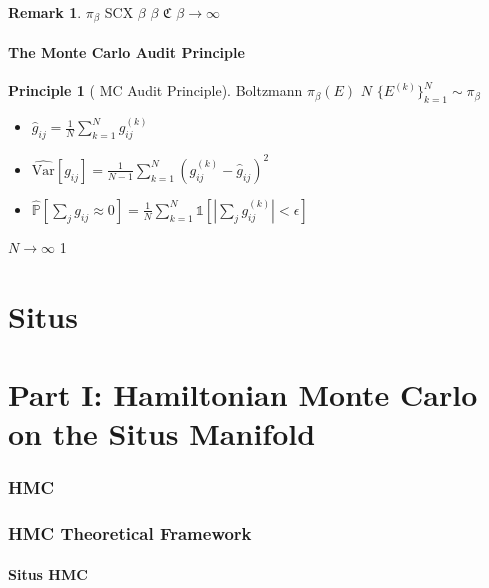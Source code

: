 \documentclass[12pt,a4paper]{article}
\theoremstyle{plain}
\theoremstyle{definition}
\newtheorem{remark}[theorem]{ Remark}
\newtheorem{principle}[theorem]{ Principle}
\newcommand{\Pbb}{\mathbb{P}}
\newcommand{\Var}{\mathrm{Var}}
\newcommand{\Cercis}{\mathfrak{C}}
\begin{document}
\begin{remark}
$\pi_\beta$  SCX \textbf{} $\beta$
 $\beta$ $\Cercis$ 
 $\beta \to \infty$ 
\end{remark}

\subsection{ The Monte Carlo Audit Principle}

\begin{principle}[ MC Audit Principle]
 Boltzmann  $\pi_\beta(E)$  $N$ 
$\{E^{(k)}\}_{k=1}^N \sim \pi_\beta$
\begin{itemize}
    \item \textbf{} $\hat{g}_{ij} = \frac{1}{N} \sum_{k=1}^N g_{ij}^{(k)}$
    \item \textbf{} $\widehat{\Var}[g_{ij}] = \frac{1}{N-1} \sum_{k=1}^N (g_{ij}^{(k)} - \hat{g}_{ij})^2$
    \item \textbf{} $\widehat{\Pbb}[\sum_j g_{ij} \approx 0] = \frac{1}{N} \sum_{k=1}^N \mathbb{1}[|\sum_j g_{ij}^{(k)}| < \epsilon]$
\end{itemize}
 $N \to \infty$  1 
\end{principle}

\newpage


\part{Situs }
\part*{Part I: Hamiltonian Monte Carlo on the Situs Manifold}

\section{HMC }
\section*{HMC Theoretical Framework}

\subsection{ Situs HMC}
\end{document}
